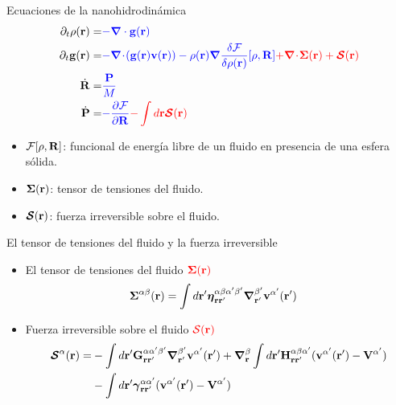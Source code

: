 \documentclass{beamer}
\newcommand{\esc}{\!\cdot\!}
\begin{document}
\begin{frame}{Ecuaciones de la nanohidrodinámica}
\begin{align}
  \partial_t\rho({\bf r})=&{\color{blue} -\boldsymbol{\nabla}\cdot{\bf g}({\bf r})}
\nonumber\\
\partial_t{\bf g}({\bf r})=&{\color{blue} -\boldsymbol{\nabla}\esc{\left({\bf g}({\bf r}){\bf v}({\bf r})\right)}
-\rho({\bf r})\boldsymbol{\nabla}\frac{\delta {\cal F}}{\delta\rho({\bf r})}[\rho,{\bf R}]}
{\color{red} +\boldsymbol{\nabla}\esc\boldsymbol{\Sigma}({\bf r})+\boldsymbol{{\cal S}}({\bf r})}
\nonumber\\
\dot{\bf R}=&{\color{blue} \frac{\bf P}{M}}
\nonumber\\
\dot{\bf P}=&{\color{blue} -\frac{\partial {\cal F}}{\partial {\bf R}}}
{\color{red} -\int d {{\bf r}}\boldsymbol{{\cal S}}({\bf r})}
\nonumber
\end{align}

\begin{itemize}
  \item ${\cal F}[\rho, {\bf R}]$: funcional de energía libre de un fluido en presencia de una esfera sólida. 
  \item $\boldsymbol{\Sigma}({\bf r})$: tensor de tensiones del fluido. 
  \item $\boldsymbol{{\cal S}}({\bf r})$: fuerza irreversible sobre el fluido. 
\end{itemize}
\end{frame}

\begin{frame}{El tensor de tensiones del fluido y la fuerza irreversible}
  \begin{itemize}
    \item<1-> El tensor de tensiones del fluido ${\color{red} \boldsymbol{\Sigma}({\bf r})}$ 
  \begin{align}
  \boldsymbol{\Sigma}^{\alpha\beta}({\bf r})&=
\int d{\bf r}'
\boldsymbol{\eta}^{\alpha\beta\alpha'\beta'}_{{\bf r}{\bf r}'}
\boldsymbol{\nabla}_{{\bf r}'}^{\beta'}{\bf v}^{\alpha'}({\bf r}')
\nonumber
\end{align}
\item<2-> Fuerza irreversible sobre el fluido ${\color{red} {\cal S}({\bf r})}$
\begin{align}
  \boldsymbol{{\cal S}}^\alpha({\bf r})=&
-\int d{\bf r}'{\bf G}^{\alpha\alpha'\beta'}_{{\bf r}{\bf r}'}
\boldsymbol{\nabla}_{{\bf r}'}^{\beta'} {\bf v}^{\alpha'}({\bf r}')
+\boldsymbol{\nabla}_{{\bf r}}^{\beta}\int d{\bf r}'{\bf H}^{\alpha\beta\alpha'}_{{\bf r}{\bf r}'}
( {\bf v}^{\alpha'}({\bf r}')-{\bf V}^{\alpha'})
\nonumber\\
&-\int d{\bf r}'
\boldsymbol{\gamma}^{\alpha\alpha'}_{{\bf r}{\bf r}'}( {\bf v}^{\alpha'}({\bf r}')
-{\bf V}^{\alpha'})
\nonumber
\end{align}
\end{itemize}
\end{frame}
\end{document}
